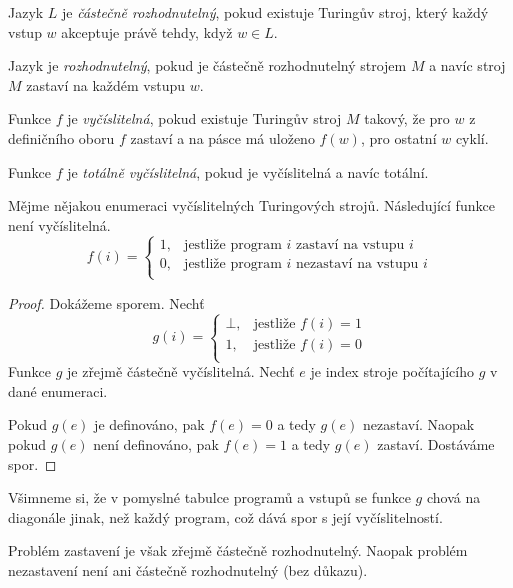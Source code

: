 \begin{definition}
    Jazyk $L$ je {\em částečně rozhodnutelný}, pokud existuje Turingův
    stroj, který každý vstup $w$ akceptuje právě tehdy, když $w \in L$.

    Jazyk je {\em rozhodnutelný}, pokud je částečně rozhodnutelný
    strojem $M$ a navíc stroj $M$ zastaví na každém vstupu $w$.

    Funkce $f$ je {\em vyčíslitelná}, pokud existuje Turingův
    stroj $M$ takový, že pro $w$ z definičního oboru $f$ zastaví a na pásce má
    uloženo $f(w)$, pro ostatní $w$ cyklí.

    Funkce $f$ je {\em totálně vyčíslitelná}, pokud je vyčíslitelná a
    navíc totální.
\end{definition}


\begin{theorem}
Mějme nějakou enumeraci vyčíslitelných Turingových strojů.
Následující funkce není vyčíslitelná.
\[
    f(i) =
    \begin{cases}
        1, & \text{jestliže program } i \text { zastaví na vstupu } i \\
        0, & \text{jestliže program } i \text { nezastaví na vstupu } i \\
    \end{cases}
\]
\end{theorem}

\begin{proof}
Dokážeme sporem. Nechť
\[
    g(i) =
    \begin{cases}
        \bot, & \text{jestliže } f(i) = 1 \\
        1, & \text{jestliže } f(i) = 0 \\
    \end{cases}
\]
Funkce $g$ je zřejmě částečně vyčíslitelná. Nechť $e$ je index stroje
počítajícího $g$ v dané enumeraci.

Pokud $g(e)$ je definováno, pak $f(e) = 0$ a tedy $g(e)$ nezastaví. Naopak
pokud $g(e)$ není definováno, pak $f(e) = 1$ a tedy $g(e)$ zastaví.
Dostáváme spor.
\end{proof}

Všimneme si, že v pomyslné tabulce programů a vstupů se funkce $g$ chová
na diagonále jinak, než každý program, což dává spor s její
vyčíslitelností.

Problém zastavení je však zřejmě částečně rozhodnutelný.
Naopak problém nezastavení není ani částečně rozhodnutelný (bez důkazu).

